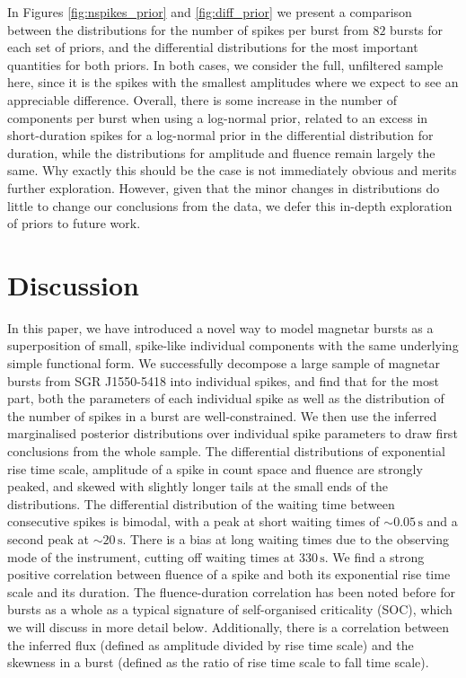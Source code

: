 \documentclass[12pt]{emulateapj}
\begin{document}
In Figures \ref{fig:nspikes_prior} and \ref{fig:diff_prior} we present a comparison between the distributions for the number of spikes 
per burst from $82$ bursts for each set of priors, and the differential distributions for the most important quantities for both priors.
In both cases, we consider the full, unfiltered sample here, since it is the spikes with the smallest amplitudes where we expect to see
an appreciable difference. Overall, there is some increase in the number of components per burst when using a log-normal prior, related to
an excess in short-duration spikes for a log-normal prior in the differential 
distribution for duration, while the distributions for amplitude and fluence remain largely the same. Why exactly this should be the case is not immediately 
obvious and merits further exploration. However, given that the minor changes in distributions do little to change our conclusions from the data, we defer this in-depth exploration of priors to future work.


\section{Discussion}
\label{ch6:discussion}

In this paper, we have introduced a novel way to model magnetar bursts as a superposition of small, spike-like individual components with the same
underlying simple functional form. We successfully decompose a large sample of magnetar bursts from SGR J1550-5418 into individual spikes, and 
find that for the most part, both the parameters of each individual spike as well as the distribution of the number of spikes in a burst are well-constrained.
We then use the inferred marginalised posterior distributions over individual spike parameters to draw first conclusions from the whole sample. 
The differential distributions of exponential rise time scale, amplitude of a spike in count space and fluence are strongly peaked, and skewed with slightly longer
tails at the small ends of the distributions. The differential distribution of the waiting time between consecutive spikes is bimodal, with a peak at short waiting times
of $\sim\!\!0.05\,\mathrm{s}$ and a second peak at $\sim\!\! 20\,\mathrm{s}$. There is a bias at long waiting times due to the observing mode of the instrument, cutting off
waiting times at $330\,\mathrm{s}$. 
We find a strong positive correlation between fluence of a spike and both its exponential rise time scale and its duration. The fluence-duration correlation has been noted
before for bursts as a whole \citep{gogus1999,gogus2000,vanderhorst2012} as a typical signature of self-organised criticality (SOC), which we will discuss in more 
detail below. 
Additionally, there is a correlation between
the inferred flux (defined as amplitude divided by rise time scale) and the skewness in a burst (defined as the ratio of rise time scale to fall time scale). 
\end{document}
